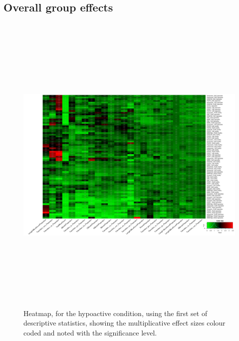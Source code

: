 \documentclass[a4paper,12pt]{article}
\begin{document}
\subsection{Overall group effects}
\newpage
\begin{figure}[h!]
\begin{center}
\includegraphics[width=16cm,height=15cm]{DarkApoLow_heatmap_all_DarkApoLow_B2MAP.png}
\caption{Heatmap, for the hypoactive condition, using the first set of descriptive statistics, showing the multiplicative effect sizes colour coded and noted with the significance level.}
\end{center}
\end{figure}
\newpage
\end{document}
